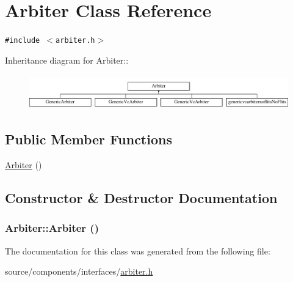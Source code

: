 \hypertarget{classArbiter}{
\section{Arbiter Class Reference}
\label{classArbiter}
}
{\tt \#include $<$arbiter.h$>$}

Inheritance diagram for Arbiter::\begin{figure}[H]
\begin{center}
\leavevmode
\includegraphics[height=1.50538cm]{classArbiter}
\end{center}
\end{figure}
\subsection*{Public Member Functions}
\begin{CompactItemize}
\item 
\hyperlink{classArbiter_ca96800fafab40183554debe9faf682d}{Arbiter} ()
\end{CompactItemize}


\subsection{Constructor \& Destructor Documentation}
\hypertarget{classArbiter_ca96800fafab40183554debe9faf682d}{
\subsubsection[{Arbiter}]{\setlength{\rightskip}{0pt plus 5cm}Arbiter::Arbiter ()}}
\label{classArbiter_ca96800fafab40183554debe9faf682d}




The documentation for this class was generated from the following file:\begin{CompactItemize}
\item 
source/components/interfaces/\hyperlink{arbiter_8h}{arbiter.h}\end{CompactItemize}
